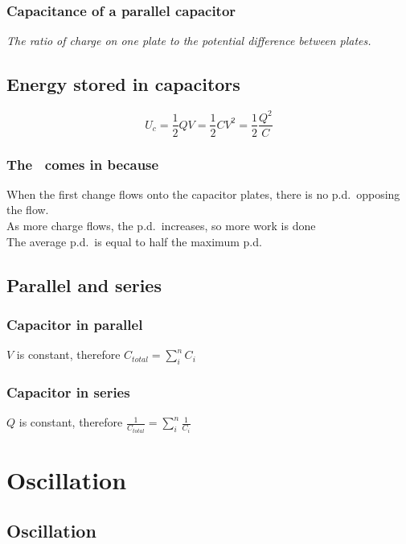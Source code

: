\documentclass[a4paper,9pt]{scrartcl}
\begin{document}
    \subsubsection{Capacitance of a parallel capacitor}
    \textit{The ratio of charge on one plate to the potential difference between plates.}

    \subsection{Energy stored in capacitors}
    \begin{displaymath}
        U_c = \label{half}\frac{1}{2}QV = \frac{1}{2}CV^2 = \frac{1}{2}\frac{Q^2}{C}
    \end{displaymath}

    \subsubsection{The\ \cite[half]{half} comes in because}
    When the first change flows onto the capacitor plates, there is no p.d.\ opposing the flow.\\
    As more charge flows, the p.d.\ increases, so more work is done\\
    The average p.d.\ is equal to half the maximum p.d.\\

    \subsection{Parallel and series}

    \subsubsection{Capacitor in parallel}

    $V$ is constant, therefore $C_{total} = \sum_{i}^{n} {C_i}$

    \subsubsection{Capacitor in series}

    $Q$ is constant, therefore $\frac{1}{C_{total}} = \sum_{i}^{n} {\frac{1}{C_i}}$


    \section{Oscillation}

    \subsection{Oscillation}
\end{document}
